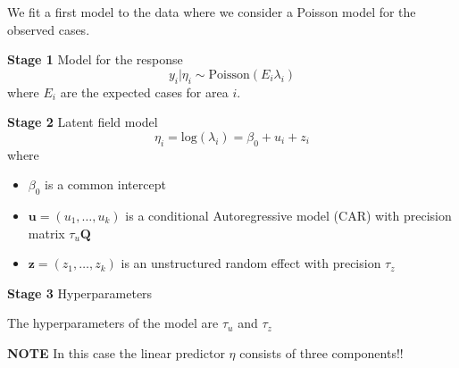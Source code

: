 \documentclass[
  letterpaper,
  DIV=11,
  numbers=noendperiod]{scrartcl}
\providecommand{\tightlist}{%
  \setlength{\itemsep}{0pt}\setlength{\parskip}{0pt}}\usepackage{longtable,booktabs,array}
\begin{document}
We fit a first model to the data where we consider a Poisson model for
the observed cases.

\textbf{Stage 1} Model for the response \[
y_i|\eta_i\sim\text{Poisson}(E_i\lambda_i)
\] where \(E_i\) are the expected cases for area \(i\).

\textbf{Stage 2} Latent field model \[
\eta_i = \text{log}(\lambda_i) = \beta_0 + u_i + z_i
\] where

\begin{itemize}
\tightlist
\item
  \(\beta_0\) is a common intercept
\item
  \(\mathbf{u} = (u_1, \dots, u_k)\) is a conditional Autoregressive
  model (CAR) with precision matrix \(\tau_u\mathbf{Q}\)
\item
  \(\mathbf{z} = (z_1, \dots, z_k)\) is an unstructured random effect
  with precision \(\tau_z\)
\end{itemize}

\textbf{Stage 3} Hyperparameters

The hyperparameters of the model are \(\tau_u\) and \(\tau_z\)

\textbf{NOTE} In this case the linear predictor \(\eta\) consists of
three components!!
\end{document}
